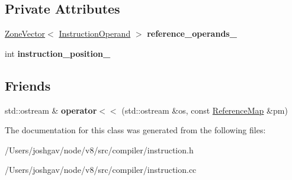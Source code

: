 \subsection*{Private Attributes}
\begin{DoxyCompactItemize}
\item 
\hyperlink{classv8_1_1internal_1_1_zone_vector}{Zone\+Vector}$<$ \hyperlink{classv8_1_1internal_1_1compiler_1_1_instruction_operand}{Instruction\+Operand} $>$ {\bfseries reference\+\_\+operands\+\_\+}\hypertarget{classv8_1_1internal_1_1compiler_1_1_reference_map_a0c992b3ac0cd2aaa4824c013605c497b}{}\label{classv8_1_1internal_1_1compiler_1_1_reference_map_a0c992b3ac0cd2aaa4824c013605c497b}

\item 
int {\bfseries instruction\+\_\+position\+\_\+}\hypertarget{classv8_1_1internal_1_1compiler_1_1_reference_map_a0a229fb570bca7523e597989ab6d4325}{}\label{classv8_1_1internal_1_1compiler_1_1_reference_map_a0a229fb570bca7523e597989ab6d4325}

\end{DoxyCompactItemize}
\subsection*{Friends}
\begin{DoxyCompactItemize}
\item 
std\+::ostream \& {\bfseries operator$<$$<$} (std\+::ostream \&os, const \hyperlink{classv8_1_1internal_1_1compiler_1_1_reference_map}{Reference\+Map} \&pm)\hypertarget{classv8_1_1internal_1_1compiler_1_1_reference_map_a464ca2d1a460a200bf9f660fa0ce003d}{}\label{classv8_1_1internal_1_1compiler_1_1_reference_map_a464ca2d1a460a200bf9f660fa0ce003d}

\end{DoxyCompactItemize}


The documentation for this class was generated from the following files\+:\begin{DoxyCompactItemize}
\item 
/\+Users/joshgav/node/v8/src/compiler/instruction.\+h\item 
/\+Users/joshgav/node/v8/src/compiler/instruction.\+cc\end{DoxyCompactItemize}
